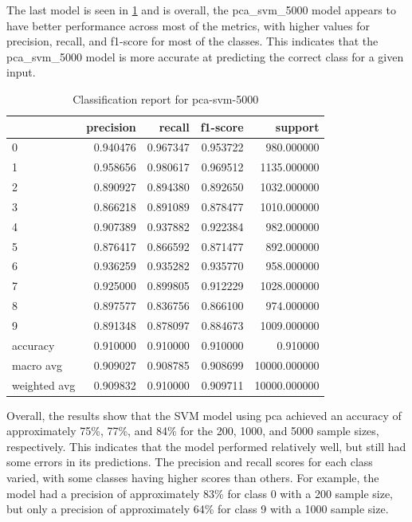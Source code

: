 The last model is seen in \ref{tab:classification-report-pca_svm_5000} and is overall, the pca\_svm\_5000 model appears to have better performance across most of the metrics, with higher values for precision, recall, and f1-score for most of the classes. This indicates that the pca\_svm\_5000 model is more accurate at predicting the correct class for a given input.

\begin{table}[htb!]
    \centering
    \begin{tabular}{lrrrr}
        \toprule
    & precision & recall & f1-score & support \\
    \midrule
    0 & 0.940476 & 0.967347 & 0.953722 & 980.000000 \\
    1 & 0.958656 & 0.980617 & 0.969512 & 1135.000000 \\
    2 & 0.890927 & 0.894380 & 0.892650 & 1032.000000 \\
    3 & 0.866218 & 0.891089 & 0.878477 & 1010.000000 \\
    4 & 0.907389 & 0.937882 & 0.922384 & 982.000000 \\
    5 & 0.876417 & 0.866592 & 0.871477 & 892.000000 \\
    6 & 0.936259 & 0.935282 & 0.935770 & 958.000000 \\
    7 & 0.925000 & 0.899805 & 0.912229 & 1028.000000 \\
    8 & 0.897577 & 0.836756 & 0.866100 & 974.000000 \\
    9 & 0.891348 & 0.878097 & 0.884673 & 1009.000000 \\
    accuracy & 0.910000 & 0.910000 & 0.910000 & 0.910000 \\
    macro avg & 0.909027 & 0.908785 & 0.908699 & 10000.000000 \\
    weighted avg & 0.909832 & 0.910000 & 0.909711 & 10000.000000 \\
    \bottomrule
\end{tabular}
\caption{Classification report for pca-svm-5000}
\label{tab:classification-report-pca_svm_5000}
    \end{table}


Overall, the results show that the SVM model using \gls{pca} achieved an accuracy of approximately 75\%, 77\%, and 84\% for the 200, 1000, and 5000 sample sizes, respectively. This indicates that the model performed relatively well, but still had some errors in its predictions. The precision and recall scores for each class varied, with some classes having higher scores than others. For example, the model had a precision of approximately 83\% for class 0 with a 200 sample size, but only a precision of approximately 64\% for class 9 with a 1000 sample size.


